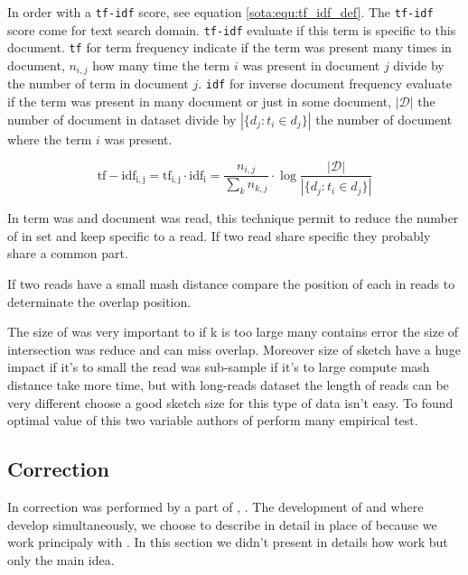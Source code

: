\documentclass[main]{subfiles}
\begin{document}
In \mhap order \kmer with a \texttt{tf-idf} score, see equation \ref{sota:equ:tf_idf_def}. The \texttt{tf-idf} score come for text search domain. \texttt{tf-idf} evaluate if this term is specific to this document. \texttt{tf} for term frequency indicate if the term was present many times in document, $n_{i,j}$ how many time the term $i$ was present in document $j$ divide by the number of term in document $j$. \texttt{idf} for inverse document frequency evaluate if the term was present in many document or just in some document, $|\mathcal{D}|$ the number of document in dataset divide by $|\{d_{j}:t_{i}\in d_{j}\}|$ the number of document where the term $i$ was present.

\begin{equation}
\mathrm{tf-idf_{i,j}} = \mathrm{tf_{i,j}} \cdot \mathrm{idf_{i}} = \frac{n_{i,j}}{\sum_{k}n_{k,j}} \cdot \log{\frac  {|\mathcal{D}|}{|\{d_{j}:t_{i}\in d_{j}\}|}}
\label{sota:equ:tf_idf_def}
\end{equation}

In \mhap term was \kmer and document was read, this technique permit to reduce the number of \kmer in set and keep \kmer specific to a read. If two read share specific \kmer they probably share a common part.

If two reads have a small mash distance \mhap compare the position of each \kmer in reads to determinate the overlap position.

The size of \kmer was very important to if k is too large many \kmer contains error the size of intersection was reduce and \mhap can miss overlap. Moreover size of sketch have a huge impact if it's to small the read was sub-sample if it's to large compute mash distance take more time, but with long-reads dataset the length of reads can be very different choose a good sketch size for this type of data isn't easy. To found optimal value of this two variable authors of \mhap perform many empirical test.

\subsection{Correction}

In \canu correction was performed by a part of  \cite{falcon}, . The development of  and \canu where develop simultaneously, we choose to describe \canu in detail in place of  because we work principaly with \canu. In this section we didn't present in details how  work but only the main idea.
\end{document}
